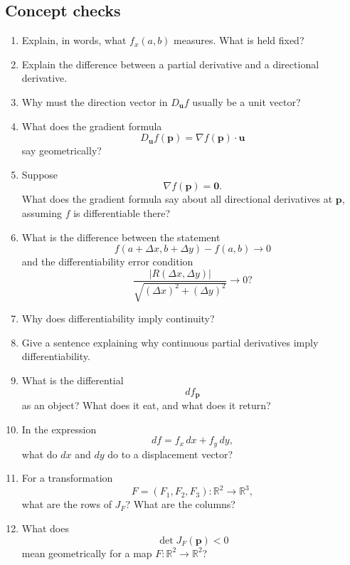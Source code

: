 \subsection*{Concept checks}

\begin{enumerate}
\item Explain, in words, what \(f_x(a,b)\) measures.  What is held fixed?

\item Explain the difference between a partial derivative and a directional derivative.

\item Why must the direction vector in \(D_{\mathbf u}f\) usually be a unit vector?

\item What does the gradient formula
\[
    D_{\mathbf u}f(\mathbf p)=\nabla f(\mathbf p)\cdot\mathbf u
\]
say geometrically?

\item Suppose
\[
    \nabla f(\mathbf p)=\mathbf 0.
\]
What does the gradient formula say about all directional derivatives at \(\mathbf p\),
assuming \(f\) is differentiable there?

\item What is the difference between the statement
\[
    f(a+\Delta x,b+\Delta y)-f(a,b)\to0
\]
and the differentiability error condition
\[
    \frac{|R(\Delta x,\Delta y)|}{\sqrt{(\Delta x)^2+(\Delta y)^2}}\to0?
\]

\item Why does differentiability imply continuity?

\item Give a sentence explaining why continuous partial derivatives imply differentiability.

\item What is the differential
\[
    df_{\mathbf p}
\]
as an object?  What does it eat, and what does it return?

\item In the expression
\[
    df=f_x\,dx+f_y\,dy,
\]
what do \(dx\) and \(dy\) do to a displacement vector?

\item For a transformation
\[
    F=(F_1,F_2,F_3):\mathbb R^2\to\mathbb R^3,
\]
what are the rows of \(J_F\)?  What are the columns?

\item What does
\[
    \det J_F(\mathbf p)<0
\]
mean geometrically for a map \(F:\mathbb R^2\to\mathbb R^2\)?


\end{enumerate}
